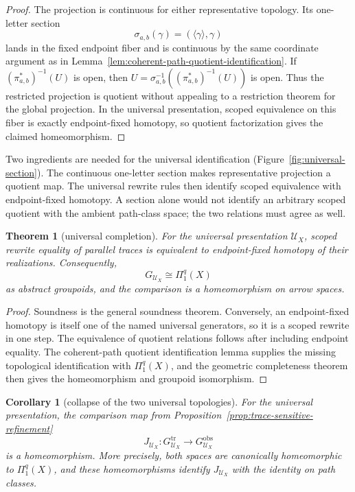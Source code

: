 \documentclass[10pt,reqno]{amsart}
\theoremstyle{definition}
\theoremstyle{plain}
\newtheorem{theorem}[definition]{Theorem}
\newtheorem{corollary}[definition]{Corollary}
\theoremstyle{remark}
\begin{document}
\begin{proof}
The projection is continuous for either representative topology.  Its
one-letter section
\[
  \sigma_{a,b}(\gamma)=(\langle\gamma\rangle,\gamma)
\]
lands in the fixed endpoint fiber and is continuous by the same coordinate
argument as in Lemma~\ref{lem:coherent-path-quotient-identification}.
If $(\pi_{a,b}^{*})^{-1}(U)$ is open, then
$U=\sigma_{a,b}^{-1}((\pi_{a,b}^{*})^{-1}(U))$ is open.  Thus the restricted
projection is quotient without appealing to a restriction theorem for the
global projection.  In the universal presentation, scoped equivalence on this
fiber is exactly endpoint-fixed homotopy, so quotient factorization gives the
claimed homeomorphism.
\end{proof}

Two ingredients are needed for the universal identification
(Figure~\ref{fig:universal-section}).  The continuous
one-letter section makes representative projection a quotient map.  The
universal rewrite rules then identify scoped equivalence with endpoint-fixed
homotopy.  A section alone would not identify an arbitrary scoped quotient
with the ambient path-class space; the two relations must agree as well.

\begin{theorem}[universal completion]\label{thm:universal-completion}
For the universal presentation $\mathcal U_X$, scoped rewrite equality of
parallel traces is equivalent to endpoint-fixed homotopy of their realizations.
Consequently,
\[
  G_{\mathcal U_X}\cong \Pi_1^q(X)
\]
as abstract groupoids, and the comparison is a homeomorphism on arrow spaces.
\end{theorem}

\begin{proof}
Soundness is the general soundness theorem.  Conversely, an endpoint-fixed
homotopy is itself one of the named universal generators, so it is a scoped
rewrite in one step.  The equivalence of quotient relations follows after
including endpoint equality.  The coherent-path quotient identification lemma
supplies the missing topological identification with $\Pi_1^q(X)$, and the
geometric completeness theorem then gives the homeomorphism and groupoid
isomorphism.
\end{proof}

\begin{corollary}[collapse of the two universal topologies]
\label{cor:universal-topology-collapse}
For the universal presentation, the comparison map from
Proposition~\ref{prop:trace-sensitive-refinement}
\[
  J_{\mathcal U_X}:G_{\mathcal U_X}^{\mathrm{tr}}
    \longrightarrow G_{\mathcal U_X}^{\mathrm{obs}}
\]
is a homeomorphism.  More precisely, both spaces are canonically
homeomorphic to $\Pi_1^q(X)$, and these homeomorphisms identify
$J_{\mathcal U_X}$ with the identity on path classes.
\end{corollary}
\end{document}
